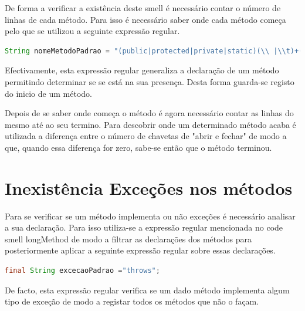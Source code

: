 \par De forma a verificar a existência deste smell é necessário contar o número de linhas de cada método. Para isso é necessário saber onde cada método começa pelo que se utilizou a seguinte expressão regular.

\begin{lstlisting}[language=Java]  
String nomeMetodoPadrao = "(public|protected|private|static)(\\ |\\t)+(?!class)[A-Za-z<>]+(\\ |\\t)+[A-Za-z]+(\\ |\\t)*(\\ |\\(.*\\{)";
\end{lstlisting}

\par Efectivamente, esta expressão regular generaliza a declaração de um método permitindo determinar se se está na sua presença. Desta forma guarda-se registo do inicio de um método.
\par Depois de se saber onde começa o método é agora necessário contar as linhas do mesmo até ao seu termino. Para descobrir onde um determinado método acaba é utilizada a diferença entre o número de chavetas de "abrir e fechar" de modo a que, quando essa diferença for zero, sabe-se então que o método terminou.

\section{Inexistência Exceções nos métodos}

\par Para se verificar se um método implementa ou não exceções é necessário analisar a sua declaração. Para isso utiliza-se a expressão regular mencionada no code smell longMethod de modo a filtrar as declarações dos métodos para posteriormente aplicar a seguinte expressão regular sobre essas declarações.

\begin{lstlisting}[language=Java]  
    final String excecaoPadrao ="throws";
\end{lstlisting}

\par De facto, esta expressão regular verifica se um dado método implementa algum tipo de exceção de modo a registar todos os métodos que não o façam.


